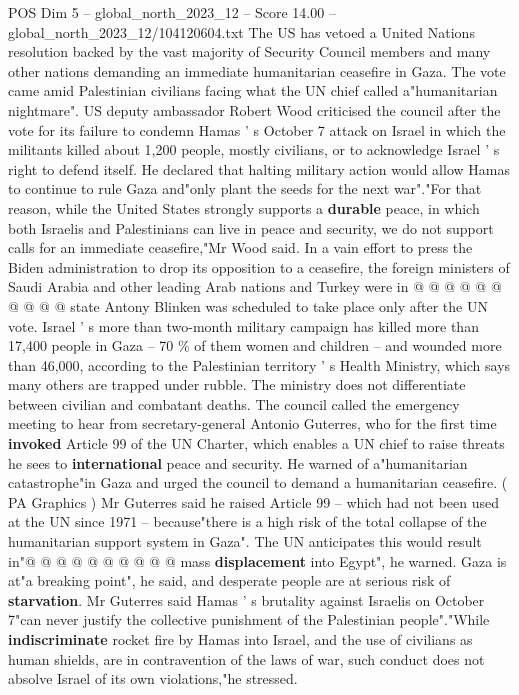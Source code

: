 \begin{textsample}{POS Dim 5 – global\_north\_2023\_12 – Score 14.00 – global\_north\_2023\_12/104120604.txt}  \label{ex:f5_pos_397}
The US has vetoed a United Nations resolution backed by the vast majority of Security Council members and many other nations demanding an immediate humanitarian ceasefire in Gaza.
The vote came amid Palestinian civilians facing what the UN chief called a"humanitarian nightmare".
US deputy ambassador Robert Wood criticised the council after the vote for its failure to condemn Hamas ' s October 7 attack on Israel in which the militants killed about 1,200 people, mostly civilians, or to acknowledge Israel ' s right to defend itself.
He declared that halting military action would allow Hamas to continue to rule Gaza and"only plant the seeds for the next war"."For that reason, while the United States strongly supports a \textbf{durable} peace, in which both Israelis and Palestinians can live in peace and security, we do not support calls for an immediate ceasefire,"Mr Wood said.
In a vain effort to press the Biden administration to drop its opposition to a ceasefire, the foreign ministers of Saudi Arabia and other leading Arab nations and Turkey were in @ @ @ @ @ @ @ @ @ @ state Antony Blinken was scheduled to take place only after the UN vote.
Israel ' s more than two-month military campaign has killed more than 17,400 people in Gaza -- 70 \% of them women and children -- and wounded more than 46,000, according to the Palestinian territory ' s Health Ministry, which says many others are trapped under rubble.
The ministry does not differentiate between civilian and combatant deaths.
The council called the emergency meeting to hear from secretary-general Antonio Guterres, who for the first time \textbf{invoked} Article 99 of the UN Charter, which enables a UN chief to raise threats he sees to \textbf{international} peace and security.
He warned of a"humanitarian catastrophe"in Gaza and urged the council to demand a humanitarian ceasefire. ( PA Graphics ) Mr Guterres said he raised Article 99 -- which had not been used at the UN since 1971 -- because"there is a high risk of the total collapse of the humanitarian support system in Gaza".
The UN anticipates this would result in"@ @ @ @ @ @ @ @ @ @ mass \textbf{displacement} into Egypt", he warned.
Gaza is at"a breaking point", he said, and desperate people are at serious risk of \textbf{starvation}.
Mr Guterres said Hamas ' s brutality against Israelis on October 7"can never justify the collective punishment of the Palestinian people"."While \textbf{indiscriminate} rocket fire by Hamas into Israel, and the use of civilians as human shields, are in contravention of the laws of war, such conduct does not absolve Israel of its own violations,"he stressed.

\end{textsample}
